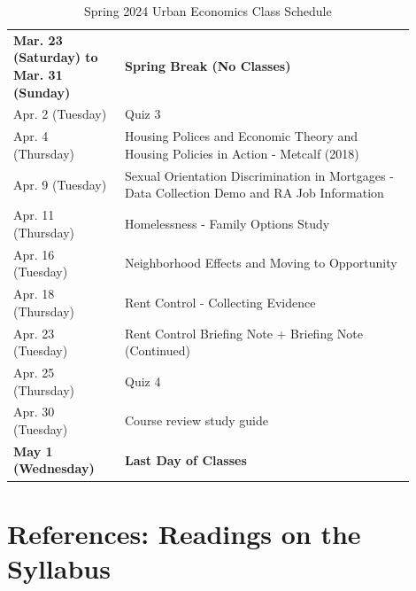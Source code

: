 \documentclass[11pt,letterpaper,final]{article}
\begin{document}
\begin{table}[H]
\begin{tabular}{@{}p{0.25\linewidth}p{0.65\linewidth}@{}}
\textbf{Mar. 23 (Saturday) to Mar. 31 (Sunday)} & \textbf{Spring Break (No Classes)} \\
Apr. 2 (Tuesday) & Quiz 3 \\
Apr. 4 (Thursday) & Housing Polices and Economic Theory and Housing Policies in Action - Metcalf (2018) \\
Apr. 9 (Tuesday) & Sexual Orientation Discrimination in Mortgages - Data Collection Demo and RA Job Information \\
Apr. 11 (Thursday) & Homelessness - Family Options Study \\
Apr. 16 (Tuesday) & Neighborhood Effects and Moving to Opportunity \\
Apr. 18 (Thursday) & Rent Control - Collecting Evidence \\
Apr. 23 (Tuesday) & Rent Control Briefing Note + Briefing Note (Continued) \\
Apr. 25 (Thursday) & Quiz 4 \\
Apr. 30 (Tuesday) & Course review study guide \\
\textbf{May 1 (Wednesday)} & \textbf{Last Day of Classes} \\

\end{tabular}
\caption{Spring 2024 Urban Economics Class Schedule}
\end{table}
  

\newpage
\section{References: Readings on the Syllabus}
\def\refname{}



\end{document}
